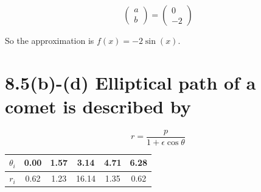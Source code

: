 \documentclass{article}
\begin{document}
\[
  \begin{pmatrix}
    a \\ b
  \end{pmatrix}
  =
  \begin{pmatrix}
    0 \\ -2
  \end{pmatrix}
\]

So the approximation is $f(x) = -2\sin(x)$.






\section*{8.5(b)-(d) \normalsize Elliptical path of a comet is described by}

$$r = \frac{p}{1 + \epsilon \cos \theta}$$

\begin{table}[h!]
  \centering
  \begin{tabular} {c | c c c c c }
    $\theta_i$ & 0.00 & 1.57 & 3.14 & 4.71 & 6.28 \\
    \hline
    $r_i$ & 0.62 & 1.23 & 16.14 & 1.35 & 0.62 \\
  \end{tabular}
\end{table}
\end{document}
